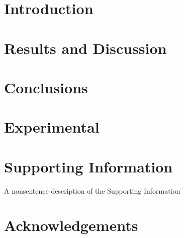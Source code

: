 \documentclass[articletitle=true]{rcclab}
\begin{document}
\section{Introduction}


\section{Results and Discussion}



\section{Conclusions}



\section{Experimental}


\section{Supporting Information}
A nonsentence description of the Supporting Information

\section{Acknowledgements}



\clearpage
\printbibliography

\end{document}
